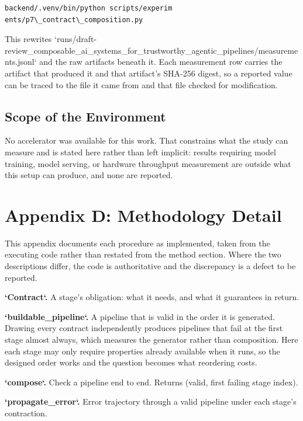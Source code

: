 \documentclass[10pt,journal,compsoc,twocolumn]{IEEEtran}
\begin{document}
\begin{scriptsize}
\begin{verbatim}
backend/.venv/bin/python scripts/experim
ents/p7\_contract\_composition.py
\end{verbatim}
\end{scriptsize}


This rewrites `runs/draft-review\_composable\_ai\_systems\_for\_trustworthy\_agentic\_pipelines/measurements.jsonl` and the raw artifacts beneath it. Each measurement row carries the artifact that produced it and that artifact's SHA-256 digest, so a reported value can be traced to the file it came from and that file checked for modification.


\subsection{Scope of the Environment}


No accelerator was available for this work. That constrains what the study can measure and is stated here rather than left implicit: results requiring model training, model serving, or hardware throughput measurement are outside what this setup can produce, and none are reported.




\section{Appendix D: Methodology Detail}


This appendix documents each procedure as implemented, taken from the executing code rather than restated from the method section. Where the two descriptions differ, the code is authoritative and the discrepancy is a defect to be reported.

\textbf{`Contract`.} A stage's obligation: what it needs, and what it guarantees in return.

\textbf{`buildable\_pipeline`.} A pipeline that is valid in the order it is generated. Drawing every contract independently produces pipelines that fail at the first stage almost always, which measures the generator rather than composition. Here each stage may only require properties already available when it runs, so the designed order works and the question becomes what reordering costs.

\textbf{`compose`.} Check a pipeline end to end. Returns (valid, first failing stage index).

\textbf{`propagate\_error`.} Error trajectory through a valid pipeline under each stage's contraction.
\end{document}
